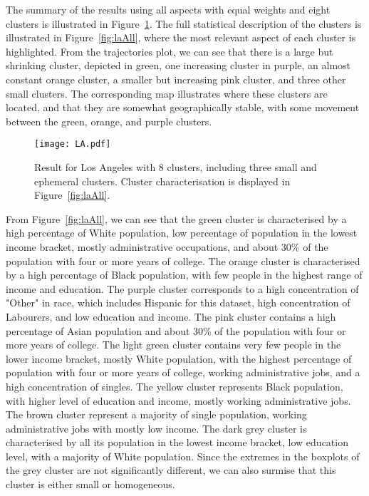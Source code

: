 The summary of the results using all aspects with equal weights and eight
clusters is illustrated in Figure~\ref{fig:la}. The full statistical description
of the clusters is illustrated in Figure~\ref{fig:laAll}, where the most
relevant aspect of each cluster is highlighted. From the trajectories plot, we
can see that there is a large but shrinking cluster, depicted in green, one
increasing cluster in purple, an almost constant orange cluster, a smaller but
increasing pink cluster, and three other small clusters. The corresponding map
illustrates where these clusters are located, and that they are somewhat
geographically stable, with some movement between the green, orange, and purple
clusters.

\begin{figure}
    \centering 
    \texttt{[image: LA.pdf]}
    \caption{Result for Los Angeles with 8 clusters, including three small and
        ephemeral clusters. Cluster characterisation is displayed
        in Figure~\ref{fig:laAll}.\label{fig:la}}
\end{figure}

From Figure~\ref{fig:laAll}, we can see that the green cluster is characterised
by a high percentage of White population, low percentage of population in the
lowest income bracket, mostly administrative occupations, and about 30\% of the
population with four or more years of college. The orange cluster is
characterised by a high percentage of Black population, with few people in the
highest range of income and education. The purple cluster corresponds to a high
concentration of "Other" in race, which includes Hispanic for this dataset, high
concentration of Labourers, and low education and income. The pink cluster
contains a high percentage of Asian population and about 30\% of the population
with four or more years of college. The light green cluster contains very few
people in the lower income bracket, mostly White population, with the highest
percentage of population with four or more years of college, working
administrative jobs, and a high concentration of singles. The yellow cluster
represents Black population, with higher level of education and income, mostly
working administrative jobs. The brown cluster represent a majority of single
population, working administrative jobs with mostly low income. The dark grey
cluster is characterised by all its population in the lowest income bracket, low
education level, with a majority of White population. Since the extremes in the
boxplots of the grey cluster are not significantly different, we can also
surmise that this cluster is either small or homogeneous.

